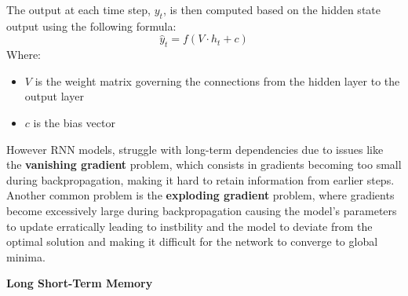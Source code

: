 The output at each time step, $y_t$, is then computed  based on the hidden state output using the following formula:
\[
\hat{y}_t = f\left(V \cdot h_t + c\right)
\]
Where: 
\begin{itemize}
    \item $V$ is the weight matrix governing the connections from the hidden layer to the output layer
    \item $c$ is the bias vector
\end{itemize}
However RNN models, struggle with long-term dependencies due to issues like the \textbf{vanishing gradient} problem, which consists in gradients becoming too small during backpropagation, making it hard to retain information from earlier steps. Another common problem is the \textbf{exploding gradient} problem, where gradients become excessively large during backpropagation causing the model's parameters to update erratically leading to instbility and the model to deviate from the optimal solution and making it difficult for the network to converge to global minima.

\textbf{Long Short-Term Memory}

